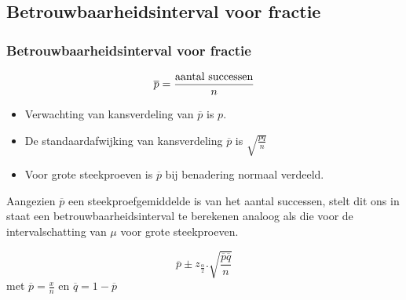 \documentclass{beamer}
\begin{document}
\subsection{Betrouwbaarheidsinterval voor fractie}
\begin{frame}
  \frametitle{Betrouwbaarheidsinterval voor fractie}
  \[ \overline{p} = \frac{\textnormal{aantal successen}}{n} \]
  \begin{itemize}
  \item Verwachting van kansverdeling van $\overline{p}$ is $p$.
  \item De standaardafwijking van kansverdeling $\overline{p}$ is $\sqrt{\frac{pq}{n}}$
  \item Voor grote steekproeven is $\overline{p}$ bij benadering normaal verdeeld.
\end{itemize}
Aangezien $\overline{p}$ een steekproefgemiddelde is van het aantal successen, stelt dit ons in staat een betrouwbaarheidsinterval te berekenen analoog als die voor de intervalschatting van $\mu$ voor grote steekproeven.


  \[ \overline{p} \pm z_{\frac{\alpha}{2}}.\sqrt{\frac{\overline{p}\overline{q}}{n}} \]
  met $\overline{p} = \frac{x}{n}$ en $\overline{q} = 1- \overline{p}$

\end{frame}
\end{document}
